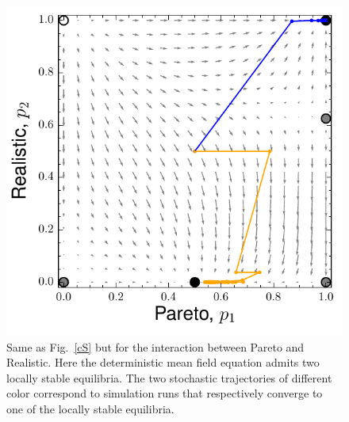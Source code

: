 \documentclass[11pt,reqno]{amsart}
\begin{document}
\begin{figure}
\begin{center}
\includegraphics[scale=0.6]{DSpr.pdf}
\caption{Same as Fig.~\ref{cS} but for the interaction between Pareto and Realistic. Here the deterministic mean field equation admits two locally stable equilibria. The two stochastic trajectories of different color correspond to simulation runs that respectively converge to one of the locally stable equilibria.}
\label{dspr}
\end{center}
\end{figure}
\end{document}
